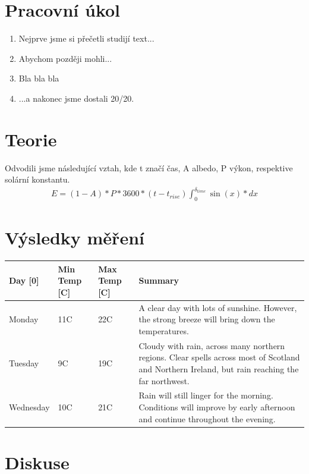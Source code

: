 \documentclass[a4paper]{article}
\author{"Patrik Novotný"}
\begin{document}
\section*{Pracovní úkol}
\begin{enumerate}[label=(\alph*)]
\item Nejprve jsme si přečetli studijí text...
\item Abychom později mohli...
\item Bla bla bla
\item ...a nakonec jsme dostali 20/20.
\end{enumerate}


\section*{Teorie}
\par Odvodili jsme následující vztah, kde t značí čas, A albedo, P výkon, respektive solární konstantu.
\begin{align}
E =(1-A)*P*3600*(t-t_{rise}) \int_{0}^{\delta_{time}} \sin(x)*dx
\end{align}
\section*{Výsledky měření}
\begin{center}
     \label{tab:title} 
    \begin{tabular}{ | l | l | l | p{5cm} |}
    \hline
    Day [0] & Min Temp [C] & Max Temp [C] & Summary \\ \hline
    Monday & 11C & 22C & A clear day with lots of sunshine.  
    However, the strong breeze will bring down the temperatures. \\ \hline
    Tuesday & 9C & 19C & Cloudy with rain, across many northern regions. Clear spells 
    across most of Scotland and Northern Ireland, 
    but rain reaching the far northwest. \\ \hline
    Wednesday & 10C & 21C & Rain will still linger for the morning. 
    Conditions will improve by early afternoon and continue 
    throughout the evening. \\
    \hline
    \end{tabular}
\end{center}

\section*{Diskuse}
\end{document}
